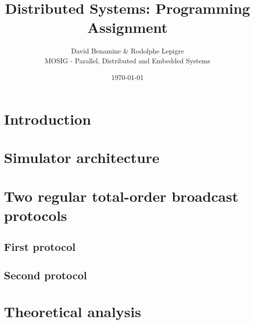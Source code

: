 \documentclass[a4paper]{article}
\begin{document}
\title{Distributed Systems: Programming Assignment}
\author{David Benamine \& Rodolphe Lepigre\\
        MOSIG - Parallel, Distributed and Embedded Systems}
        \date{\today}
        \maketitle

        \section*{Introduction}

        \section{Simulator architecture}

        \section{Two regular total-order broadcast protocols}

        \subsection{First protocol}

        \subsection{Second protocol}

        \section{Theoretical analysis}
\end{document}
